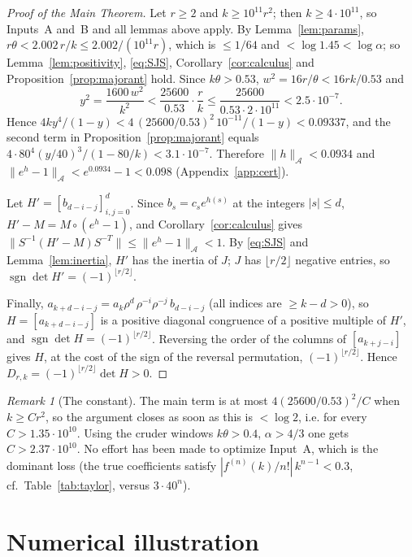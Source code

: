 \documentclass[11pt,a4paper]{article}
\numberwithin{equation}{section}
\theoremstyle{definition}
\theoremstyle{remark}
\newtheorem{remark}[theorem]{Remark}
\newcommand{\cA}{\mathcal A}
\newcommand{\sgn}{\operatorname{sgn}}
\begin{document}
\begin{proof}[Proof of the Main Theorem]
Let $r\ge2$ and $k\ge10^{11}r^2$; then $k\ge4\cdot10^{11}$, so Inputs~A and~B and all lemmas above apply.
By Lemma~\ref{lem:params}, $r\theta<2.002\,r/k\le2.002/(10^{11}r)$, which is $\le1/64$ and $<\log1.45<\log\alpha$;
so Lemma~\ref{lem:positivity}, \eqref{eq:SJS}, Corollary~\ref{cor:calculus} and Proposition~\ref{prop:majorant} hold.
Since $k\theta>0.53$, $w^2=16r/\theta<16rk/0.53$ and
\[
y^2=\frac{1600\,w^2}{k^2}<\frac{25600}{0.53}\cdot\frac rk\le\frac{25600}{0.53\cdot2\cdot10^{11}}<2.5\cdot10^{-7}.
\]
Hence $4ky^4/(1-y)<4\,(25600/0.53)^2\,10^{-11}/(1-y)<0.09337$, and the second term in
Proposition~\ref{prop:majorant} equals $4\cdot80^4(y/40)^3/(1-80/k)<3.1\cdot10^{-7}$. Therefore
$\|h\|_\cA<0.0934$ and $\|e^h-1\|_\cA<e^{0.0934}-1<0.098$ (Appendix~\ref{app:cert}).

Let $H'=[b_{d-i-j}]_{i,j=0}^d$. Since $b_s=c_se^{h(s)}$ at the integers $|s|\le d$, $H'-M=M\circ(e^h-1)$, and
Corollary~\ref{cor:calculus} gives
$\|S^{-1}(H'-M)S^{-T}\|\le\|e^h-1\|_\cA<1$. By \eqref{eq:SJS} and Lemma~\ref{lem:inertia}, $H'$ has the inertia of $J$;
$J$ has $\lfloor r/2\rfloor$ negative entries, so $\sgn\det H'=(-1)^{\lfloor r/2\rfloor}$.

Finally, $a_{k+d-i-j}=a_k\rho^d\,\rho^{-i}\rho^{-j}\,b_{d-i-j}$ (all indices are $\ge k-d>0$), so
$H=[a_{k+d-i-j}]$ is a positive diagonal congruence of a positive multiple of $H'$, and $\sgn\det H=(-1)^{\lfloor r/2\rfloor}$.
Reversing the order of the columns of $[a_{k+j-i}]$ gives $H$, at the cost of the sign of the reversal permutation,
$(-1)^{\lfloor r/2\rfloor}$. Hence $D_{r,k}=(-1)^{\lfloor r/2\rfloor}\det H>0$.
\end{proof}

\begin{remark}[The constant]\label{rem:constant}
The main term is at most $4(25600/0.53)^2/C$ when $k\ge Cr^2$, so the argument closes as soon as this is $<\log2$, i.e.
for every $C>1.35\cdot10^{10}$. Using the cruder windows $k\theta>0.4$, $\alpha>4/3$ one gets $C>2.37\cdot10^{10}$. No effort
has been made to optimize Input~A, which is the dominant loss (the true coefficients satisfy
$|f^{(n)}(k)/n!|\,k^{n-1}<0.3$, cf.\ Table~\ref{tab:taylor}, versus $3\cdot40^n$).
\end{remark}

\section{Numerical illustration}\label{sec:numerics}
\end{document}
